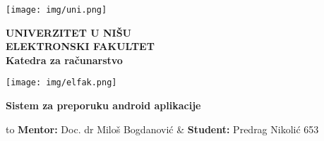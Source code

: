\documentclass[a4paper,12pt,titlepage]{article}
\begin{document}
\begin{titlepage}
    \begin{center}
    
        \texttt{[image: img/uni.png]}%
        \begin{minipage}[b]{0.7\textwidth}
            \centering
            \Large
            \textbf{UNIVERZITET U NIŠU\\ ELEKTRONSKI FAKULTET\\}       
            \large
            \textbf{Katedra za računarstvo}
        \end{minipage}%
        \texttt{[image: img/elfak.png]}
        
              
      
        \vspace{5cm}
        \Large
        \textbf{Sistem za preporuku android aplikacije}
        
        \vspace{0.6cm}
        \normalsize
    \end{center}
    
    \vspace{1cm}
   
    
    
    
    \vspace{10cm}
    
    \noindent \begin{tabu} to 
        \textbf{Mentor:} Doc. dr Miloš Bogdanović &
        \textbf{Student:} Predrag Nikolić 653
    \end{tabu}
    
    \vspace{1cm}
   
    
    
        

\end{titlepage}
\end{document}
